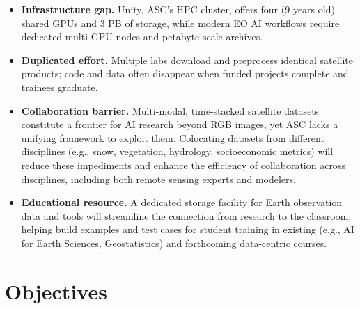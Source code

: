 \documentclass[11pt]{article}
\begin{document}
\begin{itemize}[leftmargin=*,itemsep=3pt]
\item \textbf{Infrastructure gap.}  Unity,  ASC's HPC cluster, offers four (9 years old) shared GPUs and 3 PB of storage, while modern EO AI workflows require dedicated multi-GPU nodes and petabyte-scale archives.  
\item \textbf{Duplicated effort.}  Multiple labs download and preprocess identical satellite products; code and data often disappear when funded projects complete and trainees graduate.
\item {\textbf{Collaboration barrier.} Multi-modal, time-stacked satellite datasets constitute a frontier for AI research beyond RGB images, yet ASC lacks a unifying framework to exploit them. Colocating datasets from different disciplines (e.g., snow, vegetation, hydrology, socioeconomic metrics) will reduce these impediments and enhance the efficiency of collaboration across disciplines, including both remote sensing experts and modelers. }
\item {\textbf{Educational resource.} A dedicated storage facility for Earth observation data and tools will streamline the connection from research to the classroom, helping build examples and test cases for student training in existing (e.g., AI for Earth Sciences, Geostatistics) and forthcoming data-centric courses.}
\end{itemize}

\section*{Objectives}
\end{document}
